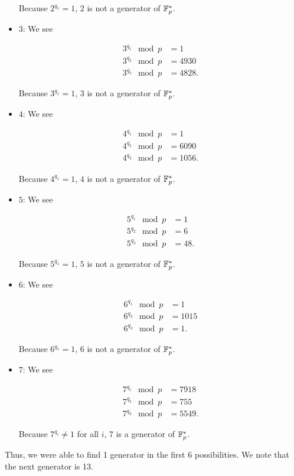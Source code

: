 \begin{example}
\begin{itemize}
\noindent
Because $2^{q_{1}} = 1$, $2$ is not a generator of $\mathbb{F}_{p}^{*}$.

\item $3$: We see

\begin{align}
    3^{q_{1}} \mod p &= 1
        \nonumber\\
    3^{q_{2}} \mod p &= 4930
        \nonumber\\
    3^{q_{3}} \mod p &= 4828.
\end{align}

\noindent
Because $3^{q_{1}} = 1$, $3$ is not a generator of $\mathbb{F}_{p}^{*}$.

\item $4$: We see

\begin{align}
    4^{q_{1}} \mod p &= 1
        \nonumber\\
    4^{q_{2}} \mod p &= 6090
        \nonumber\\
    4^{q_{3}} \mod p &= 1056.
\end{align}

\noindent
Because $4^{q_{1}} = 1$, $4$ is not a generator of $\mathbb{F}_{p}^{*}$.

\item $5$: We see

\begin{align}
    5^{q_{1}} \mod p &= 1
        \nonumber\\
    5^{q_{2}} \mod p &= 6
        \nonumber\\
    5^{q_{3}} \mod p &= 48.
\end{align}

\noindent
Because $5^{q_{1}} = 1$, $5$ is not a generator of $\mathbb{F}_{p}^{*}$.

\item $6$: We see

\begin{align}
    6^{q_{1}} \mod p &= 1
        \nonumber\\
    6^{q_{2}} \mod p &= 1015
        \nonumber\\
    6^{q_{3}} \mod p &= 1.
\end{align}

\noindent
Because $6^{q_{1}} = 1$, $6$ is not a generator of $\mathbb{F}_{p}^{*}$.

\item $7$: We see

\begin{align}
    7^{q_{1}} \mod p &= 7918
        \nonumber\\
    7^{q_{2}} \mod p &= 755
        \nonumber\\
    7^{q_{3}} \mod p &= 5549.
\end{align}

\noindent
Because $7^{q_{i}} \ne 1$ for all $i$, $7$ is a generator of $\mathbb{F}_{p}^{*}$.
\end{itemize}

Thus, we were able to find 1 generator in the first 6 possibilities.
We note that the next generator is 13.
\end{example}


